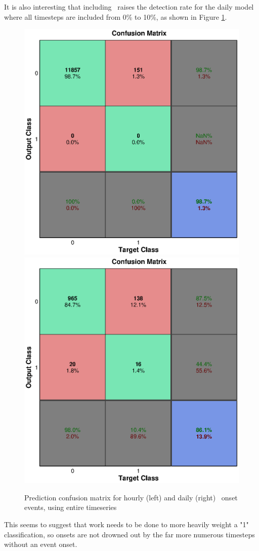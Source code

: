 It is also interesting that including \req\ raises the detection rate for the daily model where all timesteps are included from 0\% to 10\%, as shown in Figure \ref{fig:OnsetFullWithreq}.

\begin{figure}[htp!]
	\centering
	\includegraphics[width=0.45\linewidth]{Figures/CH5/NNBinaryOnset-full-hourly-withreq.eps}
	\includegraphics[width=0.45\linewidth]{Figures/CH5/NNBinaryOnset-full-daily-withreq.eps}
	\caption{Prediction confusion matrix for hourly (left) and daily (right) \req\ onset events, using entire timeseries}
	\label{fig:OnsetFullWithreq}
\end{figure}

This seems to suggest that work needs to be done to more heavily weight a "1" classification, so onsets are not drowned out by the far more numerous timesteps without an event onset.